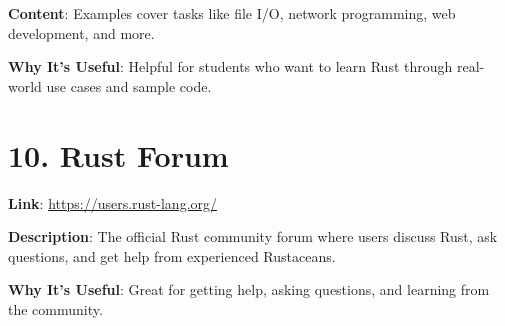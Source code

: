 \documentclass[12pt]{article}
\begin{document}
	\textbf{Content}: Examples cover tasks like file I/O, network programming, web development, and more.
	
	\textbf{Why It’s Useful}: Helpful for students who want to learn Rust through real-world use cases and sample code.
	
	\section*{10. Rust Forum}
	\textbf{Link}: \href{https://users.rust-lang.org/}{https://users.rust-lang.org/}
	
	\textbf{Description}: The official Rust community forum where users discuss Rust, ask questions, and get help from experienced Rustaceans.
	
	\textbf{Why It’s Useful}: Great for getting help, asking questions, and learning from the community.
	
\end{document}

